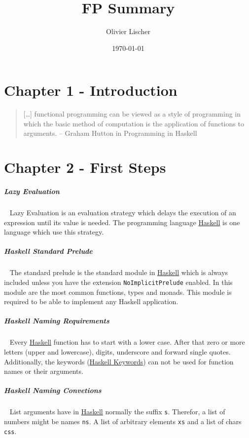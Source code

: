 \documentclass[11pt,twoside,landscape]{article}
\author{Olivier Lischer}
\date{\today}
\title{FP Summary}
\begin{document}
\pagestyle{fancy}
\fancyhf{}
\fancyfoot[CE,CO]{\leftmark}
\fancyfoot[R]{\thepage}
\begin{multicols}{3}


\section{Chapter 1 - Introduction}
\label{sec:orgdcbf428}
\begin{quote}
[\ldots{}] functional programming can be viewed as a style of programming
in which the basic method of computation is the application
of functions to arguments.
  -- Graham Hutton in Programming in Haskell
\end{quote}

\section{Chapter 2 - First Steps}
\label{sec:org1f44ac6}
\subparagraph{Lazy Evaluation} \
\label{sec:org3655179}
Lazy Evaluation is an evaluation strategy which delays the execution of an expression until its value is needed.
The programming language \href{../../../roam/20210618182407-haskell.org}{Haskell} is one language which use this strategy.

\subparagraph{Haskell Standard Prelude} \
\label{sec:orgf8d7681}
The standard prelude is the standard module in \href{../../../roam/20210618182407-haskell.org}{Haskell} which is always included unless you have the extension \texttt{NoImplicitPrelude} enabled.
In this module are the most common functions, types and monads.
This module is required to be able to implement any Haskell application.

\subparagraph{Haskell Naming Requirements} \
\label{sec:org97f3be5}
Every \href{../../../roam/20210618182407-haskell.org}{Haskell} function has to start with a lower case.
After that zero or more letters (upper and lowercase), digits, underscore and forward single quotes.
Additionally, the keywords (\href{../../../roam/20220207164910-haskell_keywords.org}{Haskell Keywords}) can not be used for function names or their arguments.

\subparagraph{Haskell Naming Convetions} \
\label{sec:orged6f2e9}
List arguments have in \href{../../../roam/20210618182407-haskell.org}{Haskell} normally the suffix \texttt{s}.
Therefor, a list of numbers might be names \texttt{ns}.
A list of arbitrary elements \texttt{xs} and a list of chars \texttt{css}.


\end{multicols}
\end{document}
